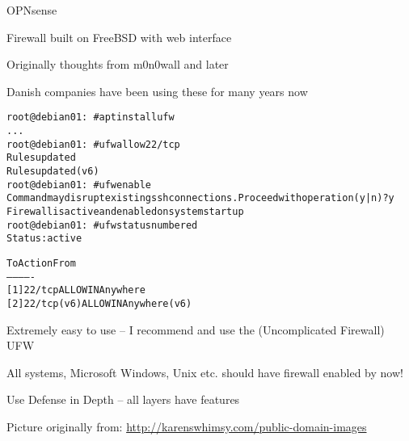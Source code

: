 \documentclass[Screen16to9,17pt]{foils}
\begin{document}


\begin{list1}
\item OPNsense 
\item Firewall built on FreeBSD with web interface
\item Originally thoughts from m0n0wall and later \\
\item Danish companies have been using these for many years now
\end{list1}



\begin{alltt}\small
root@debian01:~# apt install ufw
...
root@debian01:~# ufw allow 22/tcp
Rules updated
Rules updated (v6)
root@debian01:~# ufw enable
Command may disrupt existing ssh connections. Proceed with operation (y|n)? y
Firewall is active and enabled on system startup
root@debian01:~# ufw status numbered
Status: active

     To                         Action      From
     --                         ------      ----
[ 1] 22/tcp                     ALLOW IN    Anywhere
[ 2] 22/tcp (v6)                ALLOW IN    Anywhere (v6)
\end{alltt}

\begin{list2}
\item Extremely easy to use -- I recommend and use the (Uncomplicated Firewall) UFW
\item All systems, Microsoft Windows, Unix etc. should have firewall enabled by now!
\end{list2}



\centerline{Use Defense in Depth -- all layers have features}


\centerline{Picture originally from: \url{http://karenswhimsy.com/public-domain-images}}




\end{document}
